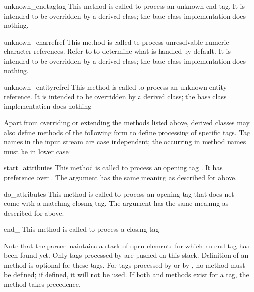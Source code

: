 \begin{funcdesc}{unknown_endtag}{tag}
This method is called to process an unknown end tag.  It is intended
to be overridden by a derived class; the base class implementation
does nothing.
\end{funcdesc}

\begin{funcdesc}{unknown_charref}{ref}
This method is called to process unresolvable numeric character
references.  Refer to  to determine what is
handled by default.  It is intended to be overridden by a derived
class; the base class implementation does nothing.
\end{funcdesc}

\begin{funcdesc}{unknown_entityref}{ref}
This method is called to process an unknown entity reference.  It is
intended to be overridden by a derived class; the base class
implementation does nothing.
\end{funcdesc}

Apart from overriding or extending the methods listed above, derived
classes may also define methods of the following form to define
processing of specific tags.  Tag names in the input stream are case
independent; the  occurring in method names must be in lower
case:

\begin{funcdescni}{start_}{attributes}
This method is called to process an opening tag .  It has
preference over .  The 
argument has the same meaning as described for
 above.
\end{funcdescni}

\begin{funcdescni}{do_}{attributes}
This method is called to process an opening tag  that does
not come with a matching closing tag.  The  argument
has the same meaning as described for  above.
\end{funcdescni}

\begin{funcdescni}{end_}{}
This method is called to process a closing tag .
\end{funcdescni}

Note that the parser maintains a stack of open elements for which no
end tag has been found yet.  Only tags processed by
 are pushed on this stack.  Definition of an
 method is optional for these tags.  For tags
processed by  or by , no
 method must be defined; if defined, it will not
be used.  If both  and 
methods exist for a tag, the  method takes
precedence.
